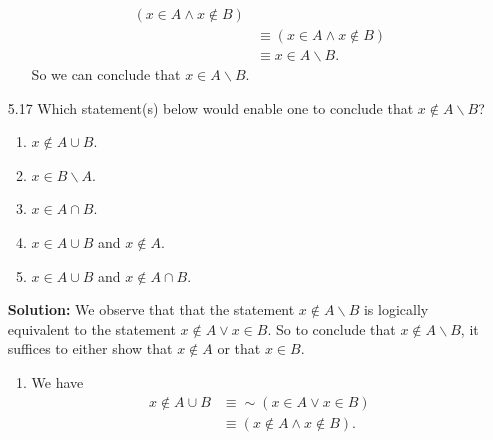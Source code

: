 \begin{enumerate}
\begin{enumerate}
\begin{align*}
                             (x \in A \land x \notin B) \\
                     &\equiv (x \in A \land x \notin B) \\
                     &\equiv x \in A{\backslash}B.
               \end{align*}
               So we can conclude that $x \in A{\backslash}B$.
      \end{enumerate}
   \item[5.17] Which statement(s) below would enable one to conclude that
               $x \notin A{\backslash}B$?
               \begin{enumerate}
                  \item $x \notin A \cup B$.
                  \item $x \in B{\backslash}A$.
                  \item $x \in A \cap B$.
                  \item $x \in A \cup B$ and $x \notin A$.
                  \item $x \in A \cup B$ and $x \notin A \cap B$.
               \end{enumerate}
               
      \textbf{Solution:} We observe that that the statement
      $x \notin A{\backslash}B$ is logically equivalent to the statement
      $x \notin A \lor x \in B$. So to conclude that $x \notin A{\backslash}B$,
      it suffices to either show that $x \notin A$ or that $x \in B$.
      
      \begin{enumerate}
         \item We have
               \begin{align*}
                  x \notin A \cup B &\equiv {\sim}(x \in A \lor x \in B) \\
                                    &\equiv (x \notin A \land x \notin B).
               \end{align*}


\end{enumerate}
\end{enumerate}
